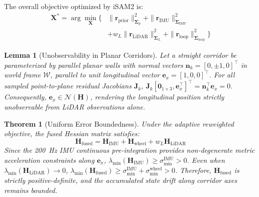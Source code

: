 \documentclass[journal]{IEEEtran}
\newtheorem{theorem}{Theorem}
\newtheorem{lemma}{Lemma}
\begin{document}
The overall objective optimized by iSAM2 \cite{dellaert2017factor} is:
\begin{equation}
\begin{aligned}
\mathbf{X}^* = \arg\min_{\mathbf{X}} \Big\{ &\|\mathbf{r}_{\text{prior}}\|_{\boldsymbol{\Sigma}_p}^2 + \|\mathbf{r}_{\text{IMU}}\|_{\boldsymbol{\Sigma}_{\text{IMU}}}^2 \\
&+ w_L \|\mathbf{r}_{\text{LiDAR}}\|_{\boldsymbol{\Sigma}_L}^2 + \|\mathbf{r}_{\text{loop}}\|_{\boldsymbol{\Sigma}_{\text{loop}}}^2 \Big\}
\end{aligned}
\end{equation}

\begin{lemma}[Unobservability in Planar Corridors]
Let a straight corridor be parameterized by parallel planar walls with normal vectors $\mathbf{n}_k = [0, \pm 1, 0]^{\top}$ in world frame $\mathcal{W}$, parallel to unit longitudinal vector $\mathbf{e}_x = [1, 0, 0]^{\top}$. For all sampled point-to-plane residual Jacobians $\mathbf{J}_k$, $\mathbf{J}_k [\mathbf{0}_{1 \times 3}, \mathbf{e}_x^{\top}]^{\top} = \mathbf{n}_k^{\top} \mathbf{e}_x = 0$. Consequently, $\mathbf{e}_x \in \mathcal{N}(\mathbf{H})$, rendering the longitudinal position strictly unobservable from LiDAR observations alone.
\end{lemma}

\begin{theorem}[Uniform Error Boundedness]
Under the adaptive reweighted objective, the fused Hessian matrix satisfies:
\begin{equation}
\mathbf{H}_{\text{fused}} = \mathbf{H}_{\text{IMU}} + \mathbf{H}_{\text{wheel}} + w_L \mathbf{H}_{\text{LiDAR}}
\end{equation}
Since the 200~Hz IMU continuous pre-integration provides non-degenerate metric acceleration constraints along $\mathbf{e}_x$, $\lambda_{\min}(\mathbf{H}_{\text{IMU}}) \ge \sigma_{\min}^{\text{IMU}} > 0$. Even when $\lambda_{\min}(\mathbf{H}_{\text{LiDAR}}) \to 0$, $\lambda_{\min}(\mathbf{H}_{\text{fused}}) \ge \sigma_{\min}^{\text{IMU}} + \sigma_{\min}^{\text{wheel}} > 0$. Therefore, $\mathbf{H}_{\text{fused}}$ is strictly positive-definite, and the accumulated state drift along corridor axes remains bounded.
\end{theorem}
\end{document}
